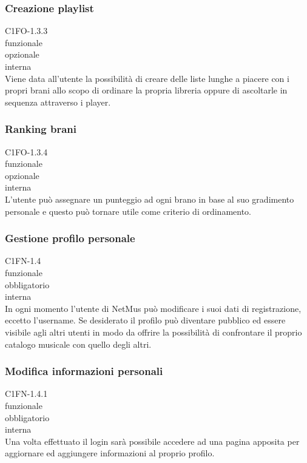 \subsubsection*{Creazione playlist}
 C1FO-1.3.3 \\
 funzionale \\
 opzionale \\
 interna \\
Viene data all'utente la possibilit\`a di creare delle liste lunghe a piacere
con i propri brani allo scopo di ordinare la propria libreria oppure di
ascoltarle in sequenza attraverso i player.

\subsubsection*{Ranking brani}
 C1FO-1.3.4 \\
 funzionale \\
 opzionale \\
 interna \\
L'utente pu\`o assegnare un punteggio ad ogni brano in base al suo gradimento
personale e questo pu\`o tornare utile come criterio di ordinamento.

\subsubsection*{Gestione profilo personale}
 C1FN-1.4 \\
 funzionale \\
 obbligatorio \\
 interna \\
In ogni momento l'utente di NetMus pu\`o modificare i suoi dati di registrazione,
eccetto l'username. Se desiderato il profilo pu\`o diventare pubblico ed essere
visibile agli altri utenti in modo da offrire la possibilit\`a di
confrontare il proprio catalogo musicale con quello degli altri.

\subsubsection*{Modifica informazioni personali}
 C1FN-1.4.1 \\
 funzionale \\
 obbligatorio \\
 interna \\
Una volta effettuato il login sar\`a possibile accedere ad una pagina apposita per
aggiornare ed aggiungere informazioni al proprio profilo.

